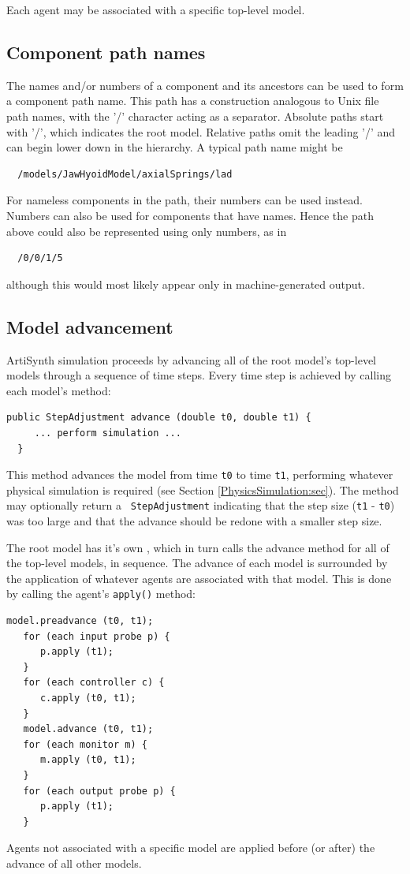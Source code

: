 Each agent may be associated with a specific top-level model.

\subsection{Component path names}
\label{PathNames:sec}

The names and/or numbers of a component and its ancestors can be used to
form a component path name. This path has a construction 
analogous to Unix file path names, with the '/' character acting as a
separator. Absolute paths start with '/', which indicates the root
model. Relative paths omit the leading '/' and can begin lower down
in the hierarchy. A typical path name might be
\begin{verbatim}
  /models/JawHyoidModel/axialSprings/lad
\end{verbatim}
For nameless components in the path, their numbers can be used
instead.  Numbers can also be used for components that have
names. Hence the path above could also be represented using
only numbers, as in
\begin{verbatim}
  /0/0/1/5
\end{verbatim}
although this would most likely appear only in machine-generated
output.

\subsection{Model advancement}
\label{ModelAdvancement:sec}

ArtiSynth simulation proceeds by advancing all of the root model's
top-level models through a sequence of time steps. Every time
step is achieved by calling each model's 
 method:
\begin{lstlisting}[]
  public StepAdjustment advance (double t0, double t1) {
     ... perform simulation ...
  }
\end{lstlisting}
This method advances the model from time {\tt t0} to time {\tt t1},
performing whatever physical simulation is required (see Section
\ref{PhysicsSimulation:sec}). The method may optionally return a {\tt
StepAdjustment} indicating that the step size ({\tt t1} - {\tt t0}) was
too large and that the advance should be redone with a smaller step
size. 

The root model has it's own
, which in
turn calls the advance method for all of the top-level models, in
sequence. The advance of each model is surrounded by the application
of whatever 
agents are associated with that model. This is done
by calling the agent's {\tt apply()} method:
\begin{lstlisting}[]
   model.preadvance (t0, t1);
   for (each input probe p) {
      p.apply (t1);
   }
   for (each controller c) {
      c.apply (t0, t1);
   }
   model.advance (t0, t1);
   for (each monitor m) {
      m.apply (t0, t1);
   }
   for (each output probe p) {
      p.apply (t1);
   }
\end{lstlisting}
Agents not associated with a specific model are applied before (or
after) the advance of all other models.

